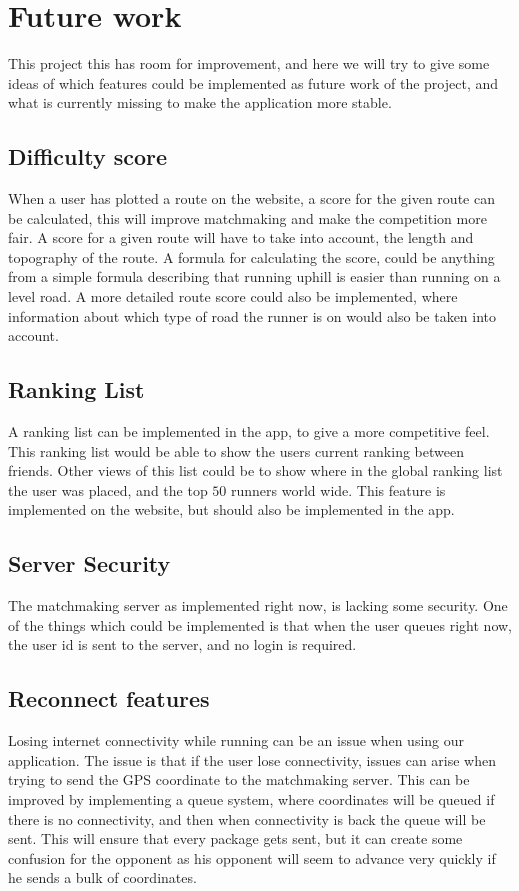 \section{Future work}
This project this has room for improvement, and here we will try to give some ideas of which features could be implemented as future work of the project, and what is currently missing to make the application more stable.

\subsection{Difficulty score}
When a user has plotted a route on the website, a score for the given route can be calculated, this will improve matchmaking and make the competition more fair.
A score for a given route will have to take into account, the length and topography of the route. A formula for calculating the score, could be anything from a simple formula describing that running uphill is easier than running on a level road. A more detailed route score could also be implemented, where information about which type of road the runner is on would also be taken into account.

\subsection{Ranking List}
A ranking list can be implemented in the app, to give a more competitive feel. This ranking list would be able to show the users current ranking between friends. Other views of this list could be to show where in the global ranking list the user was placed, and the top $50$ runners world wide. This feature is implemented on the website, but should also be implemented in the app.

\subsection{Server Security}
The matchmaking server as implemented right now, is lacking some security. One of the things which could be implemented is that when the user queues right now, the user id is sent to the server, and no login is required.

\subsection{Reconnect features}
Losing internet connectivity while running can be an issue when using our application. The issue is that if the user lose connectivity, issues can arise when trying to send the GPS coordinate to the matchmaking server. This can be improved by implementing a queue system, where coordinates will be queued if there is no connectivity, and then when connectivity is back the queue will be sent.
This will ensure that every package gets sent, but it can create some confusion for the opponent as his opponent will seem to advance very quickly if he sends a bulk of coordinates.

